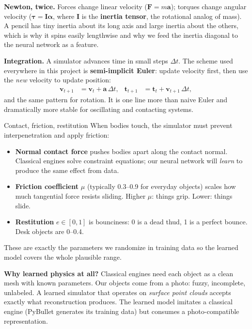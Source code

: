 \documentclass[11pt]{article}
\newcommand{\vv}{\mathbf{v}}
\newcommand{\tr}{\mathbf{t}}
\begin{document}
\textbf{Newton, twice.} Forces change linear velocity ($\mathbf{F} = m\mathbf{a}$); torques change angular velocity ($\boldsymbol{\tau} = \mathbf{I}\boldsymbol{\alpha}$, where $\mathbf{I}$ is the \textbf{inertia tensor}, the rotational analog of mass). A pencil has tiny inertia about its long axis and large inertia about the others, which is why it spins easily lengthwise and why we feed the inertia diagonal to the neural network as a feature.

\textbf{Integration.} A simulator advances time in small steps $\Delta t$. The scheme used everywhere in this project is \textbf{semi-implicit Euler}: update velocity first, then use the \emph{new} velocity to update position:
\begin{align}
\vv_{t+1} &= \vv_t + \mathbf{a}\,\Delta t, & \tr_{t+1} &= \tr_t + \vv_{t+1}\,\Delta t,
\end{align}
and the same pattern for rotation. It is one line more than naive Euler and dramatically more stable for oscillating and contacting systems.

\begin{concept}{Contact, friction, restitution}
When bodies touch, the simulator must prevent interpenetration and apply friction:
\begin{itemize}[itemsep=2pt]
  \item \textbf{Normal contact force} pushes bodies apart along the contact normal. Classical engines solve constraint equations; our neural network will \emph{learn} to produce the same effect from data.
  \item \textbf{Friction coefficient} $\mu$ (typically 0.3--0.9 for everyday objects) scales how much tangential force resists sliding. Higher $\mu$: things grip. Lower: things slide.
  \item \textbf{Restitution} $e \in [0,1]$ is bounciness: 0 is a dead thud, 1 is a perfect bounce. Desk objects are 0--0.4.
\end{itemize}
These are exactly the parameters we randomize in training data so the learned model covers the whole plausible range.
\end{concept}

\textbf{Why learned physics at all?} Classical engines need each object as a clean mesh with known parameters. Our objects come from a photo: fuzzy, incomplete, unlabeled. A learned simulator that operates on \emph{surface point clouds} accepts exactly what reconstruction produces. The learned model imitates a classical engine (PyBullet generates its training data) but consumes a photo-compatible representation.
\end{document}
